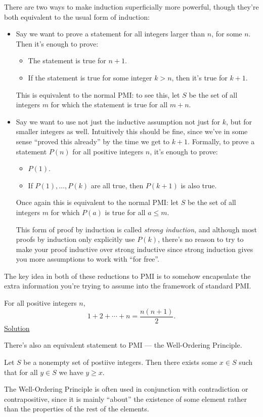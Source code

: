 There are two ways to make induction superficially more powerful, though they're
both equivalent to the usual form of induction:
\begin{itemize}
  \item Say we want to prove a statement for all integers larger than $n$, for
    some $n$. Then it's enough to prove:
    \begin{itemize}
      \item The statement is true for $n+1$.
      \item If the statement is true for some integer $k>n$, then it's true for
        $k+1$.
    \end{itemize}
    This is equivalent to the normal PMI\@: to see this, let $S$ be the set of
    all integers $m$ for which the statement is true for all $m+n$.
  \item Say we want to use not just the inductive assumption not just for $k$,
    but for smaller integers as well. Intuitively this should be fine, since
    we've in some sense ``proved this already'' by the time we get to $k+1$.
    Formally, to prove a statement $P(n)$ for all positive integers $n$, it's
    enough to prove:
    \begin{itemize}
      \item $P(1)$.
      \item If $P(1),\ldots,P(k)$ are all true, then $P(k+1)$ is also true.
    \end{itemize}
    Once again this is equivalent to the normal PMI\@: let $S$ be the set of all
    integers $m$ for which $P(a)$ is true for all $a\le m$.

    This form of proof by induction is called \emph{strong induction}, and
    although most proofs by induction only explicitly use $P(k)$, there's no
    reason to try to make your proof inductive over strong inductive since
    strong induction gives you more assumptions to work with ``for free''.
\end{itemize}
The key idea in both of these reductions to PMI is to somehow encapsulate the
extra information you're trying to assume into the framework of standard PMI\@.
\begin{result}\label{r:b:m:4:1}
  For all positive integers $n$, \[1+2+\cdots+n=\frac{n(n+1)}2.\]
  \hyperlink{s:m:4:1}{Solution}
\end{result}

There's also an equivalent statement to PMI --- the Well-Ordering Principle.
\begin{tcolorbox}
  Let $S$ be a nonempty set of postiive integers. Then there exists some $x\in
  S$ such that for all $y\in S$ we have $y\ge x$.
\end{tcolorbox}
The Well-Ordering Principle is often used in conjunction with contradiction or
contrapositive, since it is mainly ``about'' the existence of some element
rather than the properties of the rest of the elements.

